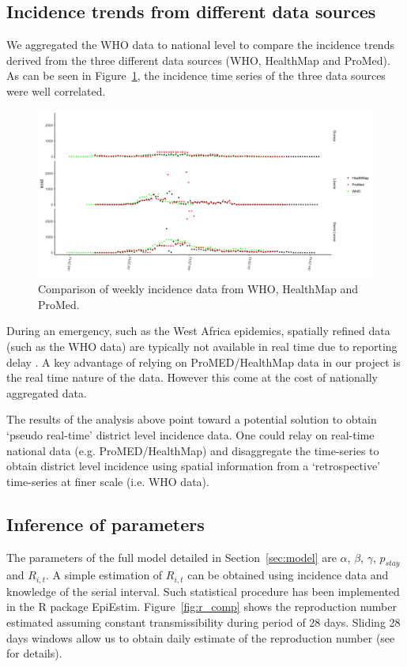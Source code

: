 \documentclass[11pt,]{article}
\begin{document}
\subsection{Incidence trends from different data sources}
We aggregated the WHO data to national level to compare the incidence
trends derived from the three different data sources (WHO, HealthMap
and ProMed). As can be seen in Figure~\ref{fig:incid_comp}, the incidence time series
of the three data sources were well correlated.

\begin{figure}
    \centering
        \includegraphics[]{ms6-figures/who_hm_pm_weekly_incid-1}
        \caption{Comparison of weekly incidence data from WHO, HealthMap and ProMed.}
        \label{fig:incid_comp}
  \end{figure}

During an emergency, such as the West Africa epidemics, spatially refined data (such as the WHO data)
are typically not available in real time due to reporting delay \citep{cori2017key}. A key advantage 
of relying on ProMED/HealthMap data in our project is the real time nature of the data. However this come at the cost
of nationally aggregated data.

The results of the analysis above point toward a potential solution to obtain `pseudo real-time' district
 level incidence data. One could relay on real-time national data (e.g. ProMED/HealthMap) and disaggregate 
the time-series to obtain district level incidence using spatial information from a `retrospective'
time-series at finer scale (i.e. WHO data).
\FloatBarrier
\subsection{Inference of parameters}

The parameters of the full model detailed in Section~\ref{sec:model} are
$\alpha$, $\beta$, $\gamma$, $p_{stay}$ and $R_{i, t}$. A simple
estimation of $R_{i, t}$ can be obtained using incidence data and knowledge of the serial interval.
Such statistical procedure has been implemented in the
R package EpiEstim. Figure~\ref{fig:r_comp} shows the
reproduction number estimated assuming constant transmissibility during period of 28 days. 
Sliding  28 days windows allow us to obtain daily estimate of the reproduction number (see \citep{cori2013new} for details).
\end{document}
